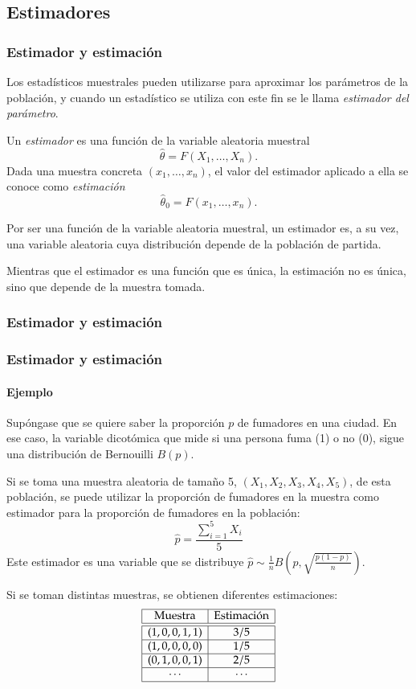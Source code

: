 \subsection{Estimadores}
\begin{frame}
\frametitle{Estimador y estimación}
Los estadísticos muestrales pueden utilizarse para aproximar los parámetros de la población, y cuando un estadístico se utiliza con este fin se le llama \emph{estimador del parámetro}.
\begin{definicion}
Un \emph{estimador} es una función de la variable aleatoria muestral
\[
\hat \theta = F(X_1,\ldots,X_n).
\]
Dada una muestra concreta $(x_1,\ldots,x_n)$, el valor del estimador aplicado a ella se conoce como \emph{estimación}
\[
\hat \theta_0 = F(x_1,\ldots,x_n).
\]
\end{definicion}

Por ser una función de la variable aleatoria muestral, un estimador es, a su vez, una variable aleatoria cuya distribución depende de la población de partida. 

Mientras que el estimador es una función que es única, la estimación no es única, sino que depende de la muestra tomada.
\end{frame}


\begin{frame}
\frametitle{Estimador y estimación}
\begin{center}

\end{center}
\end{frame}


\begin{frame}
\frametitle{Estimador y estimación}
\framesubtitle{Ejemplo}
Supóngase que se quiere saber la proporción $p$ de fumadores en una ciudad. 
En ese caso, la variable dicotómica que mide si una persona fuma (1) o no (0), sigue una distribución de Bernouilli $B(p)$.

Si se toma una muestra aleatoria de tamaño 5, $(X_1,X_2,X_3,X_4,X_5)$, de esta población, se puede utilizar la proporción de fumadores en la muestra como estimador para la proporción de fumadores en la población:
\[
\hat p = \frac{\sum_{i=1}^5 X_i}{5}
\]
Este estimador es una variable que se distribuye
$\hat p\sim \frac{1}{n}B\left(p,\sqrt{\frac{p(1-p)}{n}}\right)$.

Si se toman distintas muestras, se obtienen diferentes estimaciones:
\[
\begin{array}{|c|c|}
\hline
\mbox{Muestra} & \mbox{Estimación}\\
\hline\hline
(1, 0, 0, 1, 1) & 3/5\\
\hline
(1, 0, 0, 0, 0) & 1/5\\
\hline
(0, 1, 0, 0, 1) & 2/5\\
\hline
\cdots & \cdots\\
\hline
\end{array}
\]
\end{frame}


